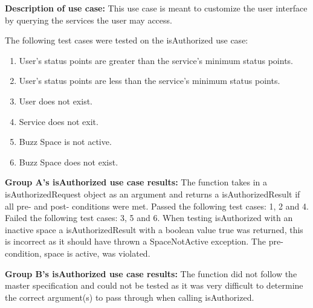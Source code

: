 \textbf{Description of use case:}\newline
This use case is meant to customize the user interface by querying the services the user may access.
\medskip

\noindent
The following test cases were tested on the isAuthorized use case:
\begin{enumerate}
	\item User's status points are greater than the service's minimum status points.
	\item User's status points are less than the service's minimum status points.
	\item User does not exist.
  	\item Service does not exit.
  	\item Buzz Space is not active.
  	\item Buzz Space does not exist.
\end{enumerate}
\medskip
\noindent
\textbf{Group A's isAuthorized use case results:}\newline
The function takes in a isAuthorizedRequest object as an argument and returns a isAuthorizedResult if all pre- and post- conditions were met.\newline
Passed the following test cases: 1, 2 and 4.\newline
Failed the following test cases: 3, 5 and 6.\newline
When testing isAuthorized with an inactive space a isAuthorizedResult with a boolean value true was returned, this is incorrect as it should have thrown a SpaceNotActive exception. The pre-condition, space is active, was violated.
\medskip

\noindent
\textbf{Group B's isAuthorized use case results:}\newline
The function did not follow the master specification and could not be tested as it was very difficult to determine the correct argument(s) to pass through when calling isAuthorized. 